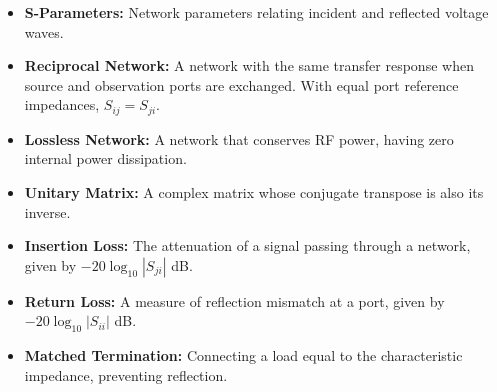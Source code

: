 \documentclass[12pt,a4paper]{article}
\begin{document}
\begin{tcolorbox}[defbox, title={\textbf{One-Line Definitions}}]
\begin{itemize}[leftmargin=*, itemsep=2.5pt, topsep=0pt]
  \item \textbf{S-Parameters:} Network parameters relating incident and reflected voltage waves.
  \item \textbf{Reciprocal Network:} A network with the same transfer response when source and observation ports are exchanged. With equal port reference impedances, $S_{ij}=S_{ji}$.
  \item \textbf{Lossless Network:} A network that conserves RF power, having zero internal power dissipation.
  \item \textbf{Unitary Matrix:} A complex matrix whose conjugate transpose is also its inverse.
  \item \textbf{Insertion Loss:} The attenuation of a signal passing through a network, given by $-20 \log_{10}|S_{ji}|$ dB.
  \item \textbf{Return Loss:} A measure of reflection mismatch at a port, given by $-20 \log_{10}|S_{ii}|$ dB.
  \item \textbf{Matched Termination:} Connecting a load equal to the characteristic impedance, preventing reflection.
\end{itemize}
\end{tcolorbox}
\end{document}
